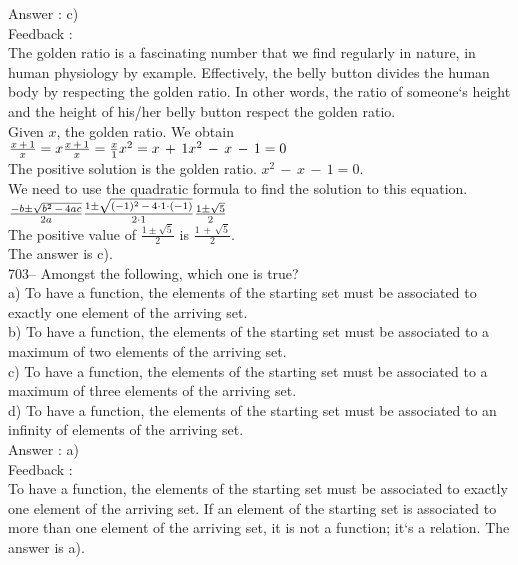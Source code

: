 \documentclass[letterpaper, 12pt]{article}
\begin{document}
Answer : c)\\

Feedback : \\
The golden ratio is a fascinating number that we find regularly in nature, in human physiology by example. Effectively, the belly button divides the human body by respecting the golden ratio. In other words, the ratio of someone`s height and the height of his/her belly button respect the golden ratio.\\
Given $x$, the golden ratio. We obtain\\[2mm]
$\frac{x\,+\,1}{x}=x\\[2mm]
\frac{x\,+\,1}{x}=\frac{x}{1}\\[2mm]
x^{2}=x\,+\,1\\[2mm]
x^{2}\,-\,x\,-\,1=0$\\[2mm]
The positive solution is the golden ratio.
$x^{2}\,-\,x\,-\,1=0$.\\
We need to use the quadratic formula to find the solution to this equation.\\[2mm]
$\frac{-b\pm\sqrt{b^{2}\,-\,4ac}}{2a}\\[2mm]
\frac{1\pm\sqrt{(-1)^{2}\,-\,4\cdot1\cdot(-1)}}{2\cdot1}\\[2mm]
\frac{1\pm\sqrt{5}}{2}$\\[2mm]
The positive value of $\frac{1\pm\sqrt{5}}{2}$ is
$\frac{1\,+\,\sqrt{5}}{2}$.\\[2mm]
The answer is c).\\


703-- Amongst the following, which one is true?\\
a) To have a function, the elements of the starting set must be associated to exactly one element of the arriving set.\\
b) To have a function, the elements of the starting set must be associated to a maximum of two elements of the arriving set.\\
c) To have a function, the elements of the starting set must be associated to a maximum of three elements of the arriving set.\\
d) To have a function, the elements of the starting set must be associated to an infinity of elements of the arriving set.\\

Answer : a)\\

Feedback : \\
To have a function, the elements of the starting set must be associated to exactly one element of the arriving set.
If an element of the starting set is associated to more than one element of the arriving set, it is not a function; it`s a relation.
The answer is a).\\
\end{document}
